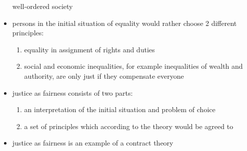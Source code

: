 \begin{itemize}
	well-ordered society
	\item persons in the initial situation of equality would rather choose
	2 different principles:
	\begin{enumerate}
		\item equality in assignment of rights and duties
		\item social and economic inequalities, for example
		inequalities of wealth and authority, are only just if they
		compensate everyone
	\end{enumerate}
	\item justice as fairness consists of two parts:
	\begin{enumerate}
		\item an interpretation of the initial situation and problem
		of choice
		\item a set of principles which according to the theory would
		be agreed to
	\end{enumerate}
	\item justice as fairness is an example of a contract theory
\end{itemize}

